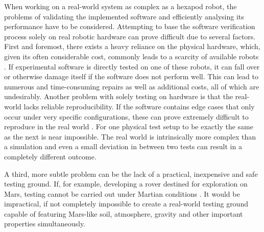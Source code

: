 When working on a real-world system as complex as a hexapod robot, the problems of validating the implemented software and efficiently analysing its performance have to be considered.
Attempting to base the software verification process solely on real robotic hardware can prove difficult due to several factors.
First and foremost, there exists a heavy reliance on the physical hardware, which, given its often considerable cost, commonly leads to a scarcity of available robots \parencite{collins2021review, marvel2014collaborative}.
If experimental software is directly tested on one of these robots, it can fall over or otherwise damage itself if the software does not perform well.
This can lead to numerous and time-consuming repairs as well as additional costs, all of which are undesirably.
Another problem with solely testing on hardware is that the real-world lacks reliable reproducibility.
If the software contains edge cases that only occur under very specific configurations, these can prove extremely difficult to reproduce in the real world  \parencite{choi2021use, hutchinsonanalysis}.
For one physical test setup to be exactly the same as the next is near impossible.
The real world is intrinsically more complex than a simulation and even a small deviation in between two tests can result in a completely different outcome.

A third, more subtle problem can be the lack of a practical, inexpensive and safe testing ground.
If, for example, developing a rover destined for exploration on Mars, testing cannot be carried out under Martian conditions \parencite{choi2021use}.
It would be impractical, if not completely impossible to create a real-world testing ground capable of featuring Mars-like soil, atmosphere, gravity and other important properties simultaneously.




